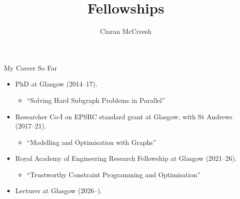 \documentclass[aspectratio=169,compress,10pt]{beamer}
\author{Ciaran McCreesh}
\title{Fellowships}
\begin{document}
{
    \begin{frame}
        \titlepage
    \end{frame}
}

\begin{frame}{My Career So Far}
    \begin{itemize}
        \item PhD at Glasgow (2014--17).
            \begin{itemize}
                \item ``Solving Hard Subgraph Problems in Parallel''
            \end{itemize}
        \item Researcher Co-I on EPSRC standard grant at Glasgow, with St Andrews (2017--21).
            \begin{itemize}
                \item ``Modelling and Optimisation with Graphs''
            \end{itemize}
        \item Royal Academy of Engineering Research Fellowship at Glasgow (2021--26).
            \begin{itemize}
                \item ``Trustworthy Constraint Programming and Optimisation''
            \end{itemize}
        \item Lecturer at Glasgow (2026--).
    \end{itemize}
\end{frame}
\end{document}
